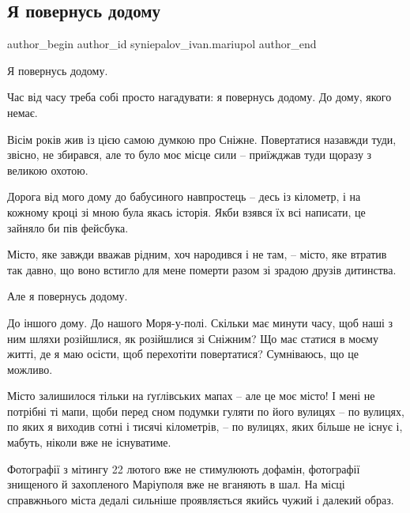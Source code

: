  
 
 
 
 

\subsection{Я повернусь додому}
\label{sec:11_02_2023.fb.syniepalov_ivan.mariupol.1.ya_povernus_dodomu}

\ifcmt
 author_begin
   author_id syniepalov_ivan.mariupol
 author_end
\fi

Я повернусь додому.

Час від часу треба собі просто нагадувати: я повернусь додому. До дому, якого
немає.

Вісім років жив із цією самою думкою про Сніжне. Повертатися назавжди туди,
звісно, не збирався, але то було моє місце сили – приїжджав туди щоразу з
великою охотою.

Дорога від мого дому до бабусиного навпростець – десь із кілометр, і на кожному
кроці зі мною була якась історія. Якби взявся їх всі написати, це зайняло би
пів фейсбука.

Місто, яке завжди вважав рідним, хоч народився і не там, – місто, яке втратив
так давно, що воно встигло для мене померти разом зі зрадою друзів дитинства.

Але я повернусь додому.

До іншого дому. До нашого Моря-у-полі. Скільки має минути часу, щоб наші з ним
шляхи розійшлися, як розійшлися зі Сніжним? Що має статися в моєму житті, де я
маю осісти, щоб перехотіти повертатися? Сумніваюсь, що це можливо.

Місто залишилося тільки на ґуґлівських мапах – але це моє місто! І мені не
потрібні ті мапи, щоби перед сном подумки гуляти по його вулицях – по вулицях,
по яких я виходив сотні і тисячі кілометрів, – по вулицях, яких більше не існує
і, мабуть, ніколи вже не існуватиме.

Фотографії з мітингу 22 лютого вже не стимулюють дофамін, фотографії знищеного
й захопленого Маріуполя вже не вганяють в шал. На місці справжнього міста
дедалі сильніше проявляється якийсь чужий і далекий образ. 

